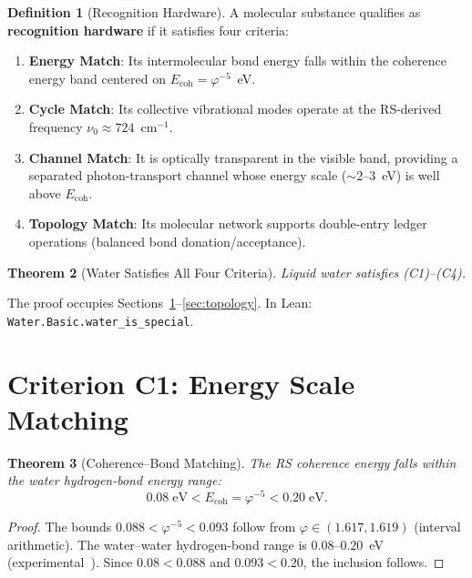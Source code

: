 \documentclass[12pt,a4paper]{article}
\newtheorem{theorem}{Theorem}[section]
\theoremstyle{definition}
\newtheorem{definition}[theorem]{Definition}
\theoremstyle{remark}
\begin{document}
\begin{definition}[Recognition Hardware]
A molecular substance qualifies as \textbf{recognition hardware} if it
satisfies four criteria:
\begin{enumerate}[label=(C\arabic*)]
  \item \textbf{Energy Match}: Its intermolecular bond energy falls
  within the coherence energy band centered on $E_{\mathrm{coh}} =
  \varphi^{-5}$~eV.
  \item \textbf{Cycle Match}: Its collective vibrational modes operate
  at the RS-derived frequency $\nu_0 \approx 724$~cm$^{-1}$.
  \item \textbf{Channel Match}: It is optically transparent in the
  visible band, providing a separated photon-transport channel whose
  energy scale ($\sim 2$--$3$~eV) is well above $E_{\mathrm{coh}}$.
  \item \textbf{Topology Match}: Its molecular network supports
  double-entry ledger operations (balanced bond donation/acceptance).
\end{enumerate}
\end{definition}

\begin{theorem}[Water Satisfies All Four Criteria]
\label{thm:water_hardware}
Liquid water satisfies (C1)--(C4).
\end{theorem}

\noindent
The proof occupies Sections~\ref{sec:energy}--\ref{sec:topology}.
In Lean: \texttt{Water.Basic.water\_is\_special}.

\section{Criterion C1: Energy Scale Matching}
\label{sec:energy}

\begin{theorem}[Coherence--Bond Matching]
\label{thm:energy_match}
The RS coherence energy falls within the water hydrogen-bond energy
range:
\begin{equation}
  \boxed{0.08\;\mathrm{eV} < E_{\mathrm{coh}} = \varphi^{-5}
  < 0.20\;\mathrm{eV}.}
\end{equation}
\end{theorem}

\begin{proof}
The bounds $0.088 < \varphi^{-5} < 0.093$ follow from
$\varphi \in (1.617, 1.619)$ (interval arithmetic).
The water--water hydrogen-bond range is $0.08$--$0.20$~eV
(experimental~\cite{SuhaiDNA1994,Chaplin2006}).
Since $0.08 < 0.088$ and $0.093 < 0.20$, the inclusion follows.
\end{proof}
\end{document}
